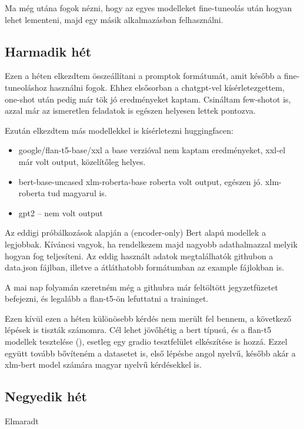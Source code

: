 \documentclass{article}
\begin{document}
Ma még utána fogok nézni, hogy az egyes modelleket fine-tuneolás után hogyan lehet lementeni, 
majd egy másik alkalmazásban felhasználni.  

\subsection{Harmadik hét}
Ezen a héten elkezdtem összeállítani a promptok formátumát, amit később a fine-tuneoláshoz használni fogok.
Ehhez elsősorban a chatgpt-vel kísérletezgettem, one-shot után pedig már tök jó eredményeket kaptam.
Csináltam few-shotot is, azzal már az ismeretlen feladatok is egészen helyesen lettek pontozva.

Ezután elkezdtem más modellekkel is kísérletezni huggingfacen:
\begin{itemize}
  \item google/flan-t5-base/xxl \-\-\> a base verzióval nem kaptam eredményeket, xxl-el már volt output, közelítőleg helyes.
  \item bert-base-uncased \/ xlm-roberta-base \/ roberta \-\-\>  volt output, egészen jó. xlm-roberta tud magyarul is.
  \item gpt2 --\> nem volt output
\end{itemize}

Az eddigi próbálkozások alapján a (encoder-only) Bert alapú modellek a legjobbak. Kíváncsi vagyok, ha 
rendelkezem majd nagyobb adathalmazzal melyik hogyan fog teljesíteni. Az eddig használt adatok megtalálhatók githubon 
a data.json fájlban, illetve a átláthatobb formátumban az example fájlokban is.

A mai nap folyamán szeretném még a githubra már feltöltött jegyzetfüzetet befejezni, és legalább a flan-t5-ön lefuttatni a 
traininget. 

Ezen kívül ezen a héten különösebb kérdés nem merült fel bennem, a következő lépések is tiszták számomra. Cél lehet jövőhétig a 
bert típusú, és a flan-t5 modellek tesztelése (), esetleg egy gradio tesztfelület elkészítése is hozzá. Ezzel együtt tovább bővíteném
a datasetet is, első lépésbe angol nyelvű, később akár a xlm-bert model számára magyar nyelvű kérdésekkel is. 

\subsection{Negyedik hét}
Elmaradt
\end{document}

